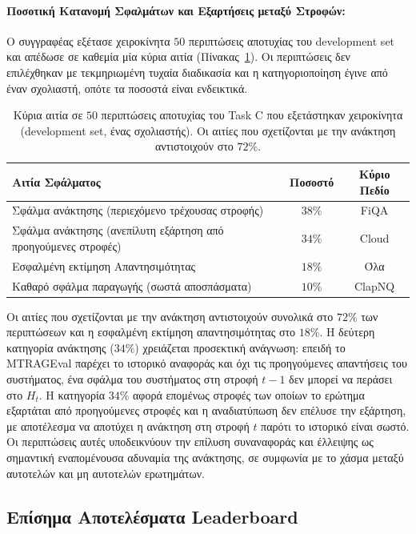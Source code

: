 \paragraph{Ποσοτική Κατανομή Σφαλμάτων και Εξαρτήσεις μεταξύ Στροφών:}
Ο συγγραφέας εξέτασε χειροκίνητα $50$ περιπτώσεις αποτυχίας του development set και απέδωσε σε καθεμία μία κύρια αιτία (Πίνακας~\ref{tab:error-decomp-greek}). Οι περιπτώσεις δεν επιλέχθηκαν με τεκμηριωμένη τυχαία διαδικασία και η κατηγοριοποίηση έγινε από έναν σχολιαστή, οπότε τα ποσοστά είναι ενδεικτικά.

\begin{table}[ht]
\centering
\small
\begin{tabular}{lcc}
\toprule
\textbf{Αιτία Σφάλματος} & \textbf{Ποσοστό} & \textbf{Κύριο Πεδίο} \\
\midrule
Σφάλμα ανάκτησης (περιεχόμενο τρέχουσας στροφής) & $38\%$ & FiQA \\
Σφάλμα ανάκτησης (ανεπίλυτη εξάρτηση από προηγούμενες στροφές) & $34\%$ & Cloud \\
Εσφαλμένη εκτίμηση Απαντησιμότητας & $18\%$ & Όλα \\
Καθαρό σφάλμα παραγωγής (σωστά αποσπάσματα) & $10\%$ & ClapNQ \\
\bottomrule
\end{tabular}
\caption{Κύρια αιτία σε $50$ περιπτώσεις αποτυχίας του Task C που εξετάστηκαν χειροκίνητα (development set, ένας σχολιαστής). Οι αιτίες που σχετίζονται με την ανάκτηση αντιστοιχούν στο $72\%$.}
\label{tab:error-decomp-greek}
\end{table}

Οι αιτίες που σχετίζονται με την ανάκτηση αντιστοιχούν συνολικά στο $72\%$ των περιπτώσεων και η εσφαλμένη εκτίμηση απαντησιμότητας στο $18\%$. Η δεύτερη κατηγορία ανάκτησης ($34\%$) χρειάζεται προσεκτική ανάγνωση: επειδή το MTRAGEval παρέχει το ιστορικό αναφοράς και όχι τις προηγούμενες απαντήσεις του συστήματος, ένα σφάλμα του συστήματος στη στροφή $t-1$ δεν μπορεί να περάσει στο $H_t$. Η κατηγορία $34\%$ αφορά επομένως στροφές των οποίων το ερώτημα εξαρτάται από προηγούμενες στροφές και η αναδιατύπωση δεν επέλυσε την εξάρτηση, με αποτέλεσμα να αποτύχει η ανάκτηση στη στροφή $t$ παρότι το ιστορικό είναι σωστό. Οι περιπτώσεις αυτές υποδεικνύουν την επίλυση συναναφοράς και έλλειψης ως σημαντική εναπομένουσα αδυναμία της ανάκτησης, σε συμφωνία με το χάσμα μεταξύ αυτοτελών και μη αυτοτελών ερωτημάτων.

\subsection{Επίσημα Αποτελέσματα Leaderboard}

